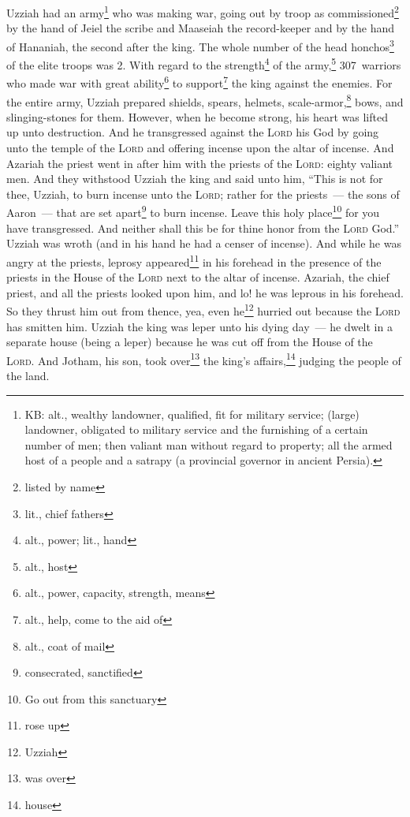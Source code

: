 \begin{inparaenum}
     Uzziah had an army\footnote{KB: alt., wealthy landowner, qualified, fit for military service; (large) landowner, obligated to military service and the furnishing of a certain number of men; then valiant man without regard to property; all the armed host of a people and a satrapy (a provincial governor in ancient Persia).} who was making war, going out by troop as commissioned\footnote{listed by name} by the hand of Jeiel the scribe and Maaseiah the record-keeper and by the hand of Hananiah, the second after the king.%
     The whole number of the head honchos\footnote{lit., chief fathers} of the elite troops was 2.%
     With regard to the strength\footnote{alt., power; lit., hand} of the army,\footnote{alt., host} 307~warriors who made war with great ability\footnote{alt., power, capacity, strength, means} to support\footnote{alt., help, come to the aid of} the king against the enemies.%
     For the entire army, Uzziah prepared shields, spears, helmets, scale-armor,\footnote{alt., coat of mail} bows, and slinging-stones for them.%
     However, when he become strong, his heart was lifted up unto destruction. And he transgressed against the \textsc{Lord} his God by going unto the temple of the \textsc{Lord} and offering incense upon the altar of incense.%
     And Azariah the priest went in after him with the priests of the \textsc{Lord}: eighty valiant men.%
     And they withstood Uzziah the king and said unto him, ``This is not for thee, Uzziah, to burn incense unto the \textsc{Lord}; rather for the priests~--- the sons of Aaron~--- that are set apart\footnote{consecrated, sanctified} to burn incense. Leave this holy place\footnote{Go out from this sanctuary} for you have transgressed. And neither shall this be for thine honor from the \textsc{Lord} God.''%
     Uzziah was wroth (and in his hand he had a censer of incense). And while he was angry at the priests, leprosy appeared\footnote{rose up} in his forehead in the presence of the priests in the House of the \textsc{Lord} next to the altar of incense.%
     Azariah, the chief priest, and all the priests looked upon him, and lo! he was leprous in his forehead. So they thrust him out from thence, yea, even he\footnote{Uzziah} hurried out because the \textsc{Lord} has smitten him.%
     Uzziah the king was leper unto his dying day~--- he dwelt in a separate house (being a leper) because he was cut off from the House of the \textsc{Lord}. And Jotham, his son, took over\footnote{was over} the king's affairs,\footnote{house} judging the people of the land.%
\end{inparaenum}
